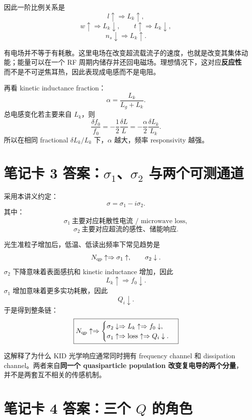 \documentclass[11pt,a4paper,openany]{ctexrep}
\begin{document}
因此一阶比例关系是
\[
l\uparrow\Rightarrow L_k\uparrow,
\]
\[
w\uparrow\Rightarrow L_k\downarrow,
\qquad
t\uparrow\Rightarrow L_k\downarrow,
\]
\[
n_s\downarrow\Rightarrow L_k\uparrow.
\]

\begin{answerbox}[title=为什么这不是“电阻”？]
有电场并不等于有耗散。这里电场在改变超流载流子的速度，也就是改变其集体动能；能量可以在一个 RF 周期内储存并还回电磁场。理想情况下，这对应\textbf{反应性}而不是不可逆焦耳热，因此表现成电感而不是电阻。
\end{answerbox}

再看 kinetic inductance fraction：
\[
\alpha=\frac{L_k}{L_g+L_k}.
\]
总电感变化若主要来自 $L_k$，则
\[
\frac{\delta f_0}{f_0}
=-\frac12\frac{\delta L}{L}
=-\frac{\alpha}{2}\frac{\delta L_k}{L_k}.
\]
所以在相同 fractional $\delta L_k/L_k$ 下，$\alpha$ 越大，频率 responsivity 越强。

\section{笔记卡 3 答案：$\sigma_1$、$\sigma_2$ 与两个可测通道}

采用本讲义约定：
\[
\sigma=\sigma_1-i\sigma_2.
\]
其中：
\[
\boxed{\sigma_1\ \text{主要对应耗散性电流 / microwave loss}},
\]
\[
\boxed{\sigma_2\ \text{主要对应超流的感性、储能响应}}.
\]

光生准粒子增加后，低温、低读出频率下常见趋势是
\[
N_{\rm qp}\uparrow
\Rightarrow
\sigma_1\uparrow,
\qquad
\sigma_2\downarrow.
\]
$\sigma_2$ 下降意味着表面感抗和 kinetic inductance 增加，因此
\[
L_k\uparrow\Rightarrow f_0\downarrow.
\]
$\sigma_1$ 增加意味着更多实功耗散，因此
\[
Q_i\downarrow.
\]
于是得到整条链：
\[
\boxed{
N_{\rm qp}\uparrow
\Rightarrow
\begin{cases}
\sigma_2\downarrow\Rightarrow L_k\uparrow\Rightarrow f_0\downarrow,\\
\sigma_1\uparrow\Rightarrow \text{loss}\uparrow\Rightarrow Q_i\downarrow.
\end{cases}}
\]

\begin{answerbox}[title=工程意义]
这解释了为什么 KID 光学响应通常同时拥有 frequency channel 和 dissipation channel。两者来自\textbf{同一个 quasiparticle population 改变复电导的两个分量}，并不是两套互不相关的传感机制。
\end{answerbox}

\section{笔记卡 4 答案：三个 $Q$ 的角色}
\end{document}
